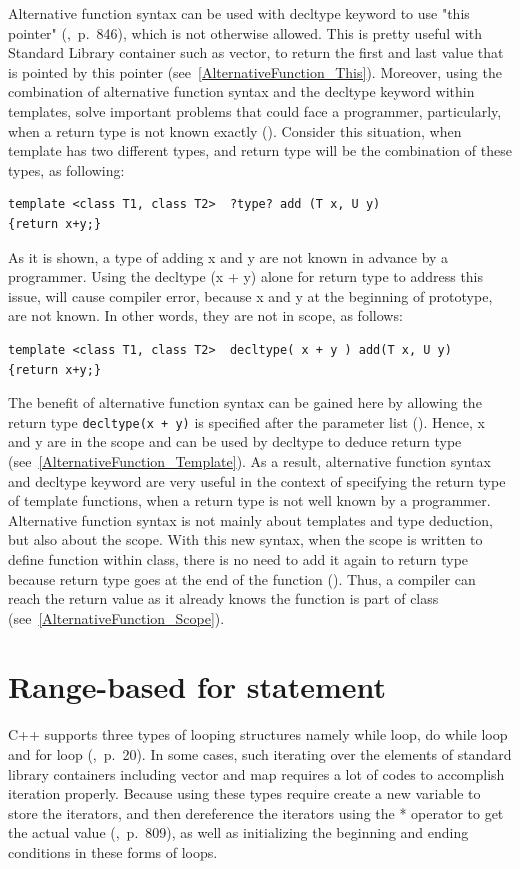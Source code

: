 \documentclass[11pt]{report}
\begin{document}
Alternative function syntax can be used with decltype keyword to use "this pointer" (\cite{ISO:2011:Cpplanguage},~p.~846), which is not otherwise allowed. This is pretty useful with Standard Library container such as vector, to return the first and last value that is pointed by this pointer (see~\ref{AlternativeFunction_This}). Moreover, using the combination of alternative function syntax and the decltype keyword within templates, solve important problems that could face a programmer, particularly, when a return type is not known exactly (\cite{Stroustrup:2012:Cpp11}). Consider this situation, when template has two different types, and return type will be the combination of these types, as following:
\begin{lstlisting}
template <class T1, class T2>  ?type? add (T x, U y) 
{return x+y;}
\end{lstlisting}

As it is shown, a type of adding x and y are not known in advance by a programmer. Using the decltype (x + y) alone for return type to address this issue, will cause compiler error, because x and y at the beginning of prototype, are not known. In other words, they are not in scope, as follows:
\begin{lstlisting}
template <class T1, class T2>  decltype( x + y ) add(T x, U y)
{return x+y;}
\end{lstlisting}

The benefit of alternative function syntax can be gained here by allowing the return type \texttt{decltype(x + y)} is specified after the parameter list (\cite{Stroustrup:2012:Cpp11}). Hence, x and y are in the scope and can be used by decltype to deduce return type (see~\ref{AlternativeFunction_Template}). As a result, alternative function syntax and decltype keyword are very useful in the context of specifying the return type of template functions, when a return type is not well known by a programmer. Alternative function syntax is not mainly about templates and type deduction, but also about the scope. With this new syntax, when the scope is written to define function within class, there is no need to add it again to return type because return type goes at the end of the function (\cite{Allain:2011:FutureCpp}). Thus, a compiler can reach the return value as it already knows the function is part of class (see~\ref{AlternativeFunction_Scope}).

\section{Range-based for statement}
\label{section: Range-based for statement}
C++ supports three types of looping structures namely while loop, do while loop and for loop (\cite{Gregorie:professionalcpp},~p.~20). In some cases, such iterating over the elements of standard library containers including vector and map requires a lot of codes to accomplish iteration properly. Because using these types require create a new variable to store the iterators, and then dereference the iterators using the * operator to get the actual value (\cite{Horstmann:2008:BC},~p.~809), as well as initializing the beginning and ending conditions in these forms of loops.
\end{document}
